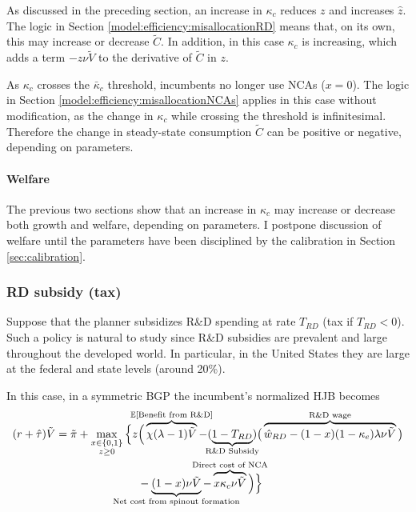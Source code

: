 \documentclass[11pt,english]{article}
\begin{document}
As discussed in the preceding section, an increase in $\kappa_c$ reduces $z$ and increases $\hat{z}$. The logic in Section \ref{model:efficiency:misallocationRD} means that, on its own, this may increase or decrease $\tilde{C}$. In addition, in this case $\kappa_c$ is increasing, which adds a term $- z\nu \tilde{V}$ to the derivative of $\tilde{C}$ in $z$. 

As $\kappa_c$ crosses the $\bar{\kappa}_c$ threshold, incumbents no longer use NCAs ($x = 0$). The logic in Section \ref{model:efficiency:misallocationNCAs} applies in this case without modification, as the change in $\kappa_c$ while crossing the threshold is infinitesimal. Therefore the change in steady-state consumption $\tilde{C}$ can be positive or negative, depending on parameters. 

\paragraph{Welfare}

The previous two sections show that an increase in $\kappa_c$ may increase or decrease both growth and welfare, depending on parameters. I postpone discussion of welfare until the parameters have been disciplined by the calibration in Section \ref{sec:calibration}.

\subsubsection{RD subsidy (tax)}

Suppose that the planner subsidizes R\&D spending at rate $T_{RD}$ (tax if $T_{RD} < 0$). Such a policy is natural to study since R\&D subsidies are prevalent and large throughout the developed world. In particular, in the United States they are large at the federal and state levels (around 20\%).

In this case, in a symmetric BGP the incumbent's normalized HJB becomes
\begin{align}
(r + \hat{\tau}) \tilde{V} = \tilde{\pi} + \max_{\substack{x \in \{0,1\} \\ z \ge 0}} \Big\{z &\Big( \overbrace{\chi (\lambda - 1) \tilde{V}}^{\mathclap{\mathbb{E}[\textrm{Benefit from R\&D}]}}- (\underbrace{1-T_{RD}}_{\mathclap{\text{R\&D Subsidy}}}) \big( \overbrace{\hat{w}_{RD} - (1-x)(1-\kappa_e)\lambda \nu \tilde{V}}^{\mathclap{\text{R\&D wage}}}\big) \label{eq:hjb_incumbent_RDsubsidy} \nonumber \\ 
&-  \underbrace{(1-x) \nu \tilde{V}}_{\mathclap{\text{Net cost from spinout formation}}} - \overbrace{x \kappa_{c} \nu \tilde{V}}^{\mathclap{\text{Direct cost of NCA}}}\Big) \Big\} 
\end{align}
\end{document}

